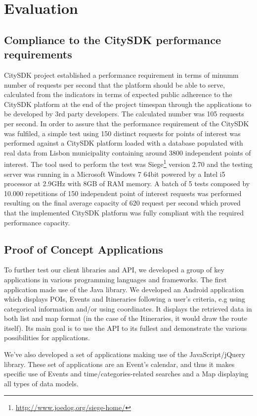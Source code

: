 \documentclass[times]{ettauth}
\begin{document}
\section{Evaluation}
\label{s:evaluation}

\subsection{Compliance to the CitySDK performance requirements}
CitySDK project established a performance requirement in terms of minumm number of requests per second that the platform should be able to serve, calculated from the indicators in terms of expected public adherence to the CitySDK platform at the end of the project timespan through the applications to be developed by 3rd party developers. The calculated number was 105 requests per second. 
In order to assure that the performance requirement of the CitySDK was fulfiled, a simple test using 150 distinct requests for points of interest was performed against a CitySDK platform loaded with a database populated with real data from Lisbon municipality containing around 3800 independent points of interest. The tool used to perform the test was Siege\footnote{\url{http://www.joedog.org/siege-home/}} version 2.70 and the testing server was running in a Microsoft Windows 7 64bit powered by a Intel i5 processor at 2.9GHz with 8GB of RAM memory.
A batch of 5 tests composed by 10.000 repetitions of 150 independent point of interest requests was performed resulting on the final average capacity of 620 request per second which proved that the implemented CitySDK platform was fully compliant with the required performance capacity.

\subsection{Proof of Concept Applications}
To further test our client libraries and API, we developed a group of key applications in various programming languages and frameworks.
The first application made use of the Java library. We developed an Android application which displays \acp{POI}, Events and Itineraries following a user's criteria, e.g using categorical information and/or using coordinates. It displays the retrieved data in both list and map format (in the case of the Itineraries, it would draw the route itself). Its main goal is to use the API to its fullest and demonstrate the various possibilities for applications.

We've also developed a set of applications making use of the JavaScript/jQuery library. These set of applications are an Event's calendar, and thus it makes specific use of Events and time/categories-related searches and a Map displaying all types of data models.
\end{document}
